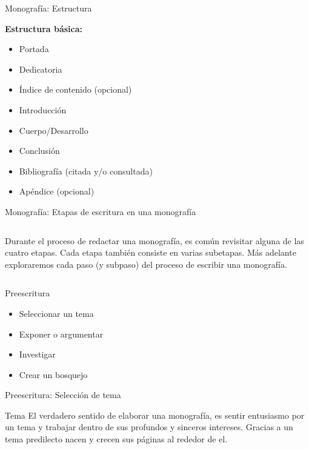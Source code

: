 \documentclass[
11pt, %
]{beamer}
\begin{document}
\begin{frame}{Monografía: Estructura}

	\textbf{Estructura básica:}
	\begin{itemize}
		\item Portada
		\item Dedicatoria
		\item Índice de contenido (opcional)
		\item Introducción
		\item Cuerpo/Desarrollo
		\item Conclusión
		\item Bibliografía (citada y/o consultada)
		\item Apéndice (opcional)
	\end{itemize}
\end{frame}

\begin{frame}{Monografía: Etapas de escritura en una monografía}

	\begin{columns}[T]
		\centering

		Durante el proceso de redactar una monografía, es común revisitar alguna de las
		cuatro etapas. Cada etapa también consiste en varias subetapas. Más adelante
		exploraremos cada paso (y subpaso) del proceso de escribir una monografía.
	\end{columns}

\end{frame}

\begin{frame}{Preescritura}
	\begin{itemize}
		\item Seleccionar un tema
		\item Exponer o argumentar
		\item Investigar
		\item Crear un bosquejo
	\end{itemize}
\end{frame}

\begin{frame}{Preescritura: Selección de tema}

	\begin{block}{Tema}
		El verdadero sentido de elaborar una monografía, es sentir entusiasmo por un tema y trabajar dentro de sus profundos y sinceros intereses. Gracias a un tema predilecto nacen y crecen sus páginas al rededor de el.
	\end{block}

\end{frame}
\end{document}
